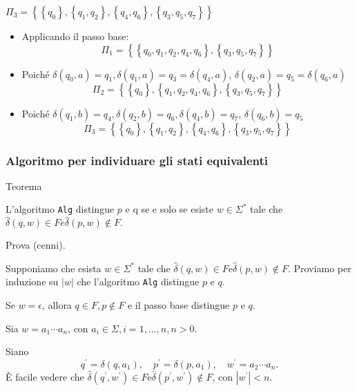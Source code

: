 $\Pi_{3}=\left\{\left\{q_{0}\right\},\left\{q_{1}, q_{2}\right\},\left\{q_{4}, q_{6}\right\},\left\{q_{3}, q_{5}, q_{7}\right\}\right\}$

\begin{itemize}
    \item Applicando il passo base:
$$
\Pi_{1}=\left\{\left\{q_{0}, q_{1}, q_{2}, q_{4}, q_{6}\right\},\left\{q_{3}, q_{5}, q_{7}\right\}\right\}
$$
    \item Poiché $\delta\left(q_{0}, a\right)=q_{1}, \delta\left(q_{1}, a\right)=q_{3}=\delta\left(q_{4}, a\right)$, $\delta\left(q_{2}, a\right)=q_{5}=\delta\left(q_{6}, a\right)$
$$
\Pi_{2}=\left\{\left\{q_{0}\right\},\left\{q_{1}, q_{2}, q_{4}, q_{6}\right\},\left\{q_{3}, q_{5}, q_{7}\right\}\right\}
$$
    \item Poiché $\delta\left(q_{1}, b\right)=q_{4}, \delta\left(q_{2}, b\right)=q_{6}, \delta\left(q_{4}, b\right)=q_{7}$, $\delta\left(q_{6}, b\right)=q_{5}$
$$
\Pi_{3}=\left\{\left\{q_{0}\right\},\left\{q_{1}, q_{2}\right\},\left\{q_{4}, q_{6}\right\},\left\{q_{3}, q_{5}, q_{7}\right\}\right\}
$$
\end{itemize}

\subsubsection{Algoritmo per individuare gli stati equivalenti}

Teorema

L'algoritmo \texttt{Alg} distingue $p$ e q se e solo se esiste $w \in \Sigma^{*}$ tale che $\hat{\delta}(q, w) \in F e \hat{\delta}(p, w) \notin F .$

\vspace{5mm}

Prova (cenni).

Supponiamo che esista $w \in \Sigma^{*}$ tale che $\hat{\delta}(q, w) \in F \mathrm{e} \hat{\delta}(p, w) \notin F$. Proviamo per induzione su $|w|$ che l'algoritmo \texttt{Alg} distingue $p$ e $q$.

Se $w=\epsilon$, allora $q \in F, p \notin F$ e il passo base distingue $p$ e $q$.

Sia $w=a_{1} \cdots a_{n}$, con $a_{i} \in \Sigma, i=1, \ldots, n, n>0$.

Siano
$$
q^{\prime}=\delta\left(q, a_{1}\right), \quad p^{\prime}=\delta\left(p, a_{1}\right), \quad w^{\prime}=a_{2} \cdots a_{n} .
$$
È facile vedere che $\hat{\delta}\left(q^{\prime}, w^{\prime}\right) \in F \mathrm{e} \hat{\delta}\left(p^{\prime}, w^{\prime}\right) \notin F$, con $\left|w^{\prime}\right|<n$.

